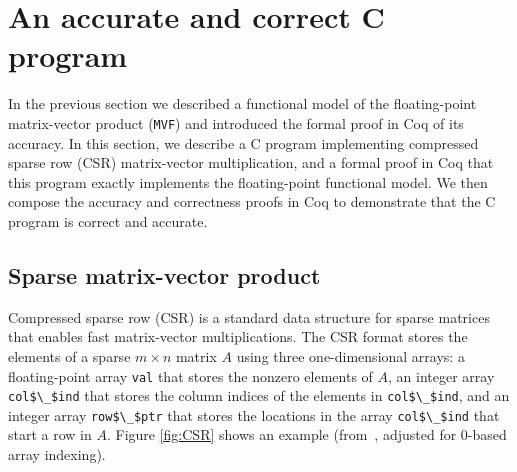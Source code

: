 \section{An accurate and correct C program}
\label{sec:sparse}

In the previous section we described a functional
model of the floating-point matrix-vector product (\lstinline{MVF}) and introduced
the formal
proof in Coq of its accuracy. In this section, we describe a C program implementing
compressed sparse
row (CSR) matrix-vector multiplication, and a formal proof in Coq that this program
exactly implements the floating-point functional model.  We then compose the accuracy and correctness proofs in Coq to demonstrate that the C program is correct and accurate.

\subsection{Sparse matrix-vector product }
\label{sparse}
Compressed sparse row (CSR) is a standard data structure for
sparse matrices that enables fast matrix-vector
multiplications\cite[\S4.3.1]{barret94:templates}. The CSR
format stores the elements of a sparse $m\times n$ matrix $A$
using three one-dimensional arrays: a floating-point array
\lstinline{val} that stores the nonzero elements of $A$, an
integer array \lstinline{col$\_$ind} that stores the column
indices of the elements in \lstinline{col$\_$ind}, and an integer
array \lstinline{row$\_$ptr} that stores the locations in the array
\lstinline{col$\_$ind} that start a row in $A$. 
Figure \ref{fig:CSR} shows an example
(from~\cite{barret94:templates}, adjusted for 0-based array indexing).
